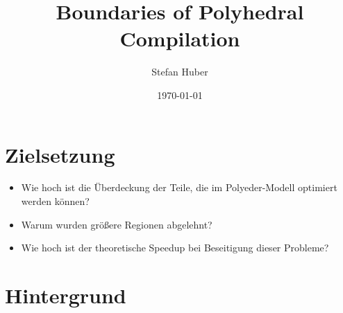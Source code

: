 \documentclass[aspectratio=169, xcolor=dvipsnames]{beamer}
\title[Eine empirische Studie]{Boundaries of Polyhedral Compilation}
\author{Stefan Huber}
\institute{
    Fakultät für Informatik und Mathematik\\
    Universität Passau
}
\date{\today}
\newcommand{\draftnote}[1]{{\color{red} \textbf{#1}}}
\begin{document}
\maketitle


\section{Zielsetzung}
\begin{frame}{\secname}
    \begin{itemize}
        \item Wie hoch ist die Überdeckung der Teile, die im Polyeder-Modell optimiert werden können?
        \item Warum wurden größere Regionen abgelehnt?
        \item Wie hoch ist der theoretische Speedup bei Beseitigung dieser Probleme?
    \end{itemize}
\end{frame}

\section{Hintergrund}
\end{document}
